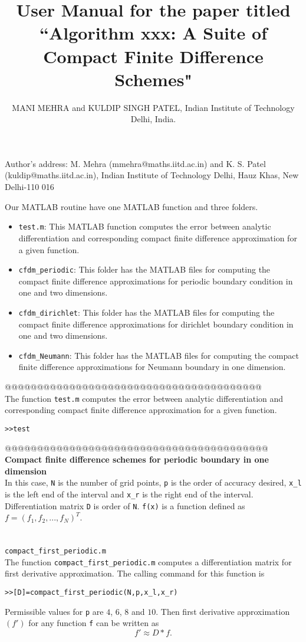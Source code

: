 \documentclass[acmtoms]{acmtrans2m}
\title{ User Manual for the paper titled ``Algorithm xxx: A Suite of Compact Finite Difference Schemes"}
\author{MANI MEHRA and KULDIP SINGH PATEL, Indian Institute of Technology Delhi, India.}
\begin{document}
\begin{bottomstuff}
Author's address: M. Mehra (mmehra@maths.iitd.ac.in) and K. S. Patel
(kuldip@maths.iitd.ac.in), Indian Institute of Technology Delhi, Hauz
Khas, New Delhi-110 016
\end{bottomstuff}
\maketitle
Our MATLAB routine have one MATLAB function and three folders.
\begin{itemize}
\item \verb#test.m#: This MATLAB function computes the error between analytic differentiation and corresponding compact finite difference approximation for a given function.
\item \verb#cfdm_periodic#: This folder has the MATLAB files for computing the compact finite difference approximations for periodic boundary condition in one and two dimensions.
\item \verb#cfdm_dirichlet#: This folder has the MATLAB files for computing the compact finite difference approximations for dirichlet boundary condition in one and two dimensions.
\item \verb#cfdm_Neumann#: This folder has the MATLAB files for computing the compact finite difference approximations for Neumann boundary in one dimension.
\end{itemize}
@@@@@@@@@@@@@@@@@@@@@@@@@@@@@@@@@@@@@@@@\\
 The function \verb#test.m# computes the error between analytic differentiation and corresponding compact finite difference approximation for a given function.
\begin{alltt}
>>test
\end{alltt}
@@@@@@@@@@@@@@@@@@@@@@@@@@@@@@@@@@@@@@@@@\\
\textbf{Compact finite difference schemes for periodic boundary in one dimension}\\
 In this case, \verb#N# is the number of grid points, \verb#p# is the order of accuracy desired, \verb#x_l# is the left end of the interval and \verb#x_r# is the right end of the interval. Differentiation matrix \verb#D# is order of \verb#N#. \verb#f(x)# is a function defined as $f=(f_{1},f_{2},...,f_{N})^T$.
\section{} \verb#compact_first_periodic.m#\\
 The function \verb#compact_first_periodic.m# computes a differentiation matrix for first derivative approximation. The calling command for this function is
\begin{alltt}
>>[D]=compact_first_periodic(N,p,x_l,x_r)
\end{alltt}
Permissible values for \verb#p# are $4$, $6$, $8$ and $10$. Then first derivative approximation $(f')$ for any function \verb#f# can be written as
\[
f'\approx D*f.
\]
\end{document}
